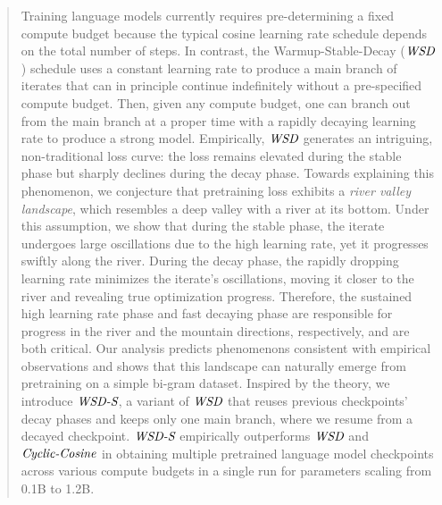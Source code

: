 \documentclass{article}
\begin{document}
\begin{abstract}



Training language models currently requires pre-determining a fixed compute budget because the typical cosine learning rate schedule depends on the total number of steps. In contrast, the Warmup-Stable-Decay ($\wsd$) schedule uses a constant learning rate to produce a main branch of iterates that can in principle continue indefinitely without a pre-specified compute budget. Then, given any compute budget, one can branch out from the main branch at a proper time with a rapidly decaying learning rate to produce a strong model.
Empirically, $\wsd$ generates an intriguing, non-traditional loss curve: the loss remains elevated during the stable phase but sharply declines during the decay phase. 
Towards explaining this phenomenon, we conjecture that pretraining loss exhibits a \emph{river valley landscape}, which resembles a deep valley with a river at its bottom. Under this assumption, we show that during the stable phase, the iterate undergoes large oscillations due to the high learning rate, yet it progresses swiftly along the river. During the decay phase, the rapidly dropping learning rate minimizes the iterate's oscillations, moving it closer to the river and revealing true optimization progress. Therefore, the sustained high learning rate phase and fast decaying phase are responsible for progress in the river and the mountain directions, respectively, and are both critical. Our analysis predicts phenomenons consistent with empirical observations and shows that this landscape can naturally emerge from pretraining on a simple bi-gram dataset.
Inspired by the theory, we introduce $\wsds$, a variant of $\wsd$ that reuses previous checkpoints' decay phases and keeps only one main branch, where we resume from a decayed checkpoint. $\wsds$ empirically outperforms $\wsd$ and $\cycliccosine$ in obtaining multiple pretrained language model checkpoints across various compute budgets in a single run for parameters scaling from 0.1B to 1.2B. 
\end{abstract}










\newpage



\newpage
\appendix


\end{document}

